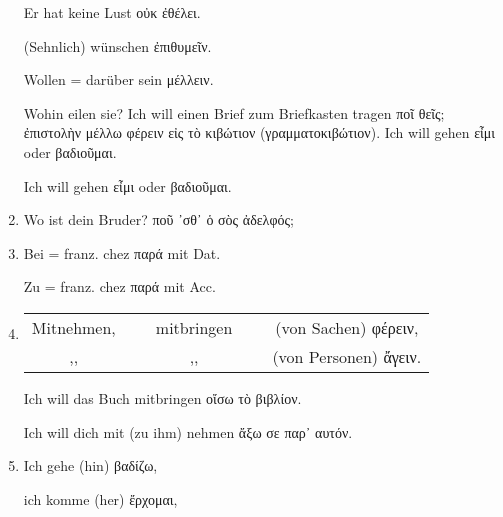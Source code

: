 \begin{enumerate}[leftmargin=0pt,rightmargin=0pt,listparindent =1cm,labelindent=1cm,labelsep=1ex,labelwidth={*},itemindent={*},align=left]
\begin{continuousitemline}
Er hat keine Lust \textgreek[variant=ancient]{οὐκ ἐθέλει.}


(Sehnlich) wünschen \textgreek[variant=ancient]{ἐπιθυμεῖν. }


Wollen = darüber sein \textgreek[variant=ancient]{μέλλειν.}\par\end{continuousitemline}


Wohin eilen sie? Ich will einen Brief zum Briefkasten tragen \textgreek[variant=ancient]{ποῖ
θεῖς; ἐπιστολὴν μέλλω φέρειν εἰς τὸ κιβώτιον (γραμματοκιβώτιον). Ich
will gehen εἶμι oder βαδιοῦμαι.} 


\begin{continuousitemline}Ich will gehen \textgreek[variant=ancient]{εἶμι}
oder \textgreek[variant=ancient]{βαδιοῦμαι.}\par\end{continuousitemline}

\item Wo ist dein Bruder? \textgreek[variant=ancient]{ποῦ ᾽σθ᾽ ὁ σὸς ἀδελφός;}
\item Bei = franz. \textfrench{chez} \textgreek[variant=ancient]{παρά} mit
\textlatin{Dat.}


\begin{continuousitemline}Zu = franz. \textfrench{chez} \textgreek[variant=ancient]{παρά}
mit \textlatin{Acc.}\par\end{continuousitemline}

\item %
\begin{tabular}[t]{ccccc}
Mitnehmen, & ~ & mitbringen & ~ & (von Sachen) \textgreek[variant=ancient]{φέρειν,}\tabularnewline
,, &  & ,, &  & (von Personen) \textgreek[variant=ancient]{ἄγειν.}\tabularnewline
\end{tabular}


\begin{continuousitemline}Ich will das Buch mitbringen \textgreek[variant=ancient]{οἴσω
τὸ βιβλίον.}


Ich will dich mit (zu ihm) nehmen \textgreek[variant=ancient]{ἄξω
σε παρ᾽ αυτόν.}\par\end{continuousitemline}

\item Ich gehe (hin) \textgreek[variant=ancient]{βαδίζω,}


\begin{continuousitemline}ich komme (her) \textgreek[variant=ancient]{ἔρχομαι,}



\end{continuousitemline}
\end{enumerate}
